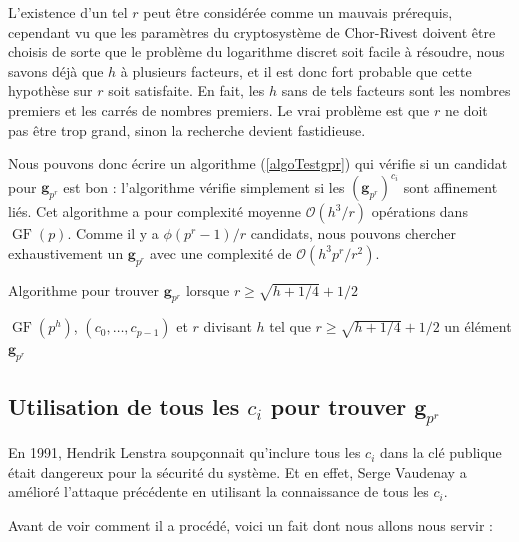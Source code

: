 \documentclass[a4paper, titlepage, 11pt]{article}
\theoremstyle{definition}
\theoremstyle{remark}
\def\O{\mathcal O}
\def\gf{\operatorname{GF}}
\def\mbf#1{\mathbf{#1}}
\begin{document}
L'existence d'un tel $r$ peut être considérée comme un mauvais prérequis, cependant vu que les paramètres du cryptosystème de Chor-Rivest doivent être choisis de sorte que le problème du logarithme discret soit facile à résoudre, nous savons déjà que $h$ à plusieurs facteurs, et il est donc fort probable que cette hypothèse sur $r$ soit satisfaite. En fait, les $h$ sans de tels facteurs sont les nombres premiers et les carrés de nombres premiers. Le vrai problème est que $r$ ne doit pas être trop grand, sinon la recherche devient fastidieuse.

Nous pouvons donc écrire un algorithme (\ref{algoTestgpr}) qui vérifie si un candidat pour $\mbf g_{p^r}$ est bon : l'algorithme vérifie simplement si les $(\mbf g_{p^r})^{c_i}$ sont affinement liés. Cet algorithme a pour complexité moyenne $\O(h^3/r)$ opérations dans $\gf(p)$. Comme il y a $\phi(p^r-1)/r$ candidats, nous pouvons chercher exhaustivement un $\mbf g_{p^r}$ avec une complexité de $\O(h^3p^r/r^2)$.

\begin{algorithm}[h]
\caption{Algorithme pour trouver $\mbf g_{p^r}$ lorsque $r\geqslant \sqrt{h + 1/4} + 1/2$}
\label{algoTestgpr}
\begin{algorithmic}[1]
\REQUIRE $\gf(p^h)$, $(c_0,\dots, c_{p-1})$ et $r$ divisant $h$ tel que $r\geqslant \sqrt{h + 1/4} + 1/2$
\ENSURE un élément $\mbf g_{p^r}$
\FORALL{$\zeta \in \gf(p^h)$ générateur de $\gf(p^r)^\times$} \label{algoTestgprboucle}
		\ENDIF
	\ENDFOR
	\RETURN{$\zeta$}
\ENDFOR
\end{algorithmic}
\end{algorithm}

\subsection{Utilisation de tous les $c_i$ pour trouver $\mbf g_{p^r}$}

En 1991, Hendrik Lenstra \cite{lenstra1991} soupçonnait qu'inclure tous les $c_i$ dans la clé publique était dangereux pour la sécurité du système. Et en effet, Serge Vaudenay a amélioré l'attaque précédente en utilisant la connaissance de tous les $c_i$. 

Avant de voir comment il a procédé, voici un fait dont nous allons nous servir :
\end{document}
